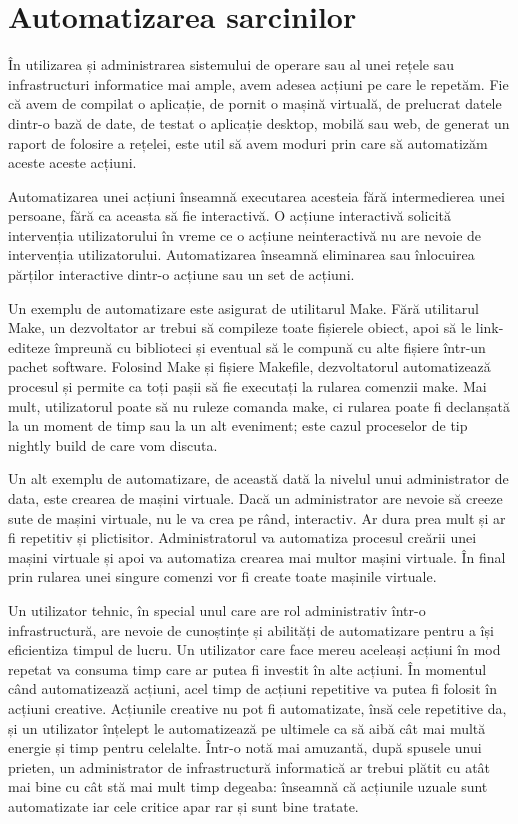 \chapter{Automatizarea sarcinilor}
\label{chapter:auto}

În utilizarea și administrarea sistemului de operare sau al unei rețele sau
infrastructuri informatice mai ample, avem adesea acțiuni pe care le repetăm.
Fie că avem de compilat o aplicație, de pornit o mașină virtuală, de prelucrat
datele dintr-o bază de date, de testat o aplicație desktop, mobilă sau web, de
generat un raport de folosire a rețelei, este util să avem moduri prin care să
automatizăm aceste aceste acțiuni.

Automatizarea unei acțiuni înseamnă executarea acesteia fără intermedierea unei
persoane, fără ca aceasta să fie interactivă. O acțiune interactivă solicită
intervenția utilizatorului în vreme ce o acțiune neinteractivă nu are nevoie de
intervenția utilizatorului. Automatizarea înseamnă eliminarea sau înlocuirea
părților interactive dintr-o acțiune sau un set de acțiuni.

Un exemplu de automatizare este asigurat de utilitarul Make. Fără utilitarul
Make, un dezvoltator ar trebui să compileze toate fișierele obiect, apoi să le
link-editeze împreună cu biblioteci și eventual să le compună cu alte fișiere
într-un pachet software. Folosind Make și fișiere Makefile, dezvoltatorul
automatizează procesul și permite ca toți pașii să fie executați la rularea
comenzii make. Mai mult, utilizatorul poate să nu ruleze comanda make, ci
rularea poate fi declanșată la un moment de timp sau la un alt eveniment; este
cazul proceselor de tip nightly build de care vom discuta.

Un alt exemplu de automatizare, de această dată la nivelul unui administrator de
data, este crearea de mașini virtuale. Dacă un administrator are nevoie să
creeze sute de mașini virtuale, nu le va crea pe rând, interactiv. Ar dura prea
mult și ar fi repetitiv și plictisitor. Administratorul va automatiza procesul
creării unei mașini virtuale și apoi va automatiza crearea mai multor mașini
virtuale. În final prin rularea unei singure comenzi vor fi create toate
mașinile virtuale.

Un utilizator tehnic, în special unul care are rol administrativ într-o
infrastructură, are nevoie de cunoștințe și abilități de automatizare pentru a
își eficientiza timpul de lucru. Un utilizator care face mereu aceleași acțiuni
în mod repetat va consuma timp care ar putea fi investit în alte acțiuni. În
momentul când automatizează acțiuni, acel timp de acțiuni repetitive va putea fi
folosit în acțiuni creative. Acțiunile creative nu pot fi automatizate, însă
cele repetitive da, și un utilizator înțelept le automatizează pe ultimele ca să
aibă cât mai multă energie și timp pentru celelalte. Într-o notă mai amuzantă,
după spusele unui prieten, un administrator de infrastructură informatică ar
trebui plătit cu atât mai bine cu cât stă mai mult timp degeaba: înseamnă că
acțiunile uzuale sunt automatizate iar cele critice apar rar și sunt bine
tratate.

